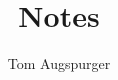 \documentclass[12pt,a4paper]{article}                      %
\begin{document}

\begin{titlepage}

\title{Notes}
\author{Tom Augspurger}                               %

\vspace*{\fill}                                            %


\center                                                    %






\vspace*{\fill}                                            %

\end{titlepage}
\end{document}

